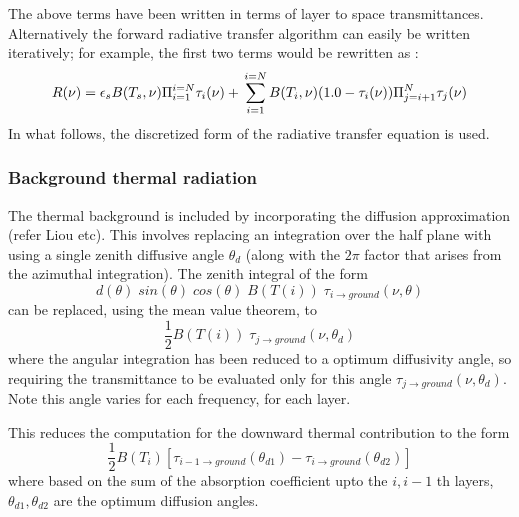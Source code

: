 \documentclass[12pt]{article}
\begin{document}
{{{{The above terms have been written in terms of layer to space transmittances. 
Alternatively the forward radiative transfer algorithm can easily be written 
iteratively; for example, the first two terms would be rewritten as : 
\begin{equation}
R(\nu) = \epsilon_{s}B(T_{s},\nu) \Pi_{i=1}^{i=N} \tau_{i}(\nu) + \\
         \sum_{i=1}^{i=N} B(T_{i},\nu) (1.0 - \tau_{i}(\nu))\\
         \Pi_{j=i+1}^{N} \tau_{j}(\nu)
\end{equation}
In what follows, the discretized form of the radiative transfer equation 
is used.

\subsubsection{Background thermal radiation}

The thermal background is included by incorporating the diffusion approximation
(refer Liou etc).  This involves replacing an integration over the half plane
with using a single zenith diffusive angle $\theta_{d}$ (along with the 
$2\pi$ factor that arises from the azimuthal integration). 
The zenith integral of the form
\begin{equation}
    d(\theta) \; sin(\theta) \; cos(\theta) \; B(T(i)) \;
    \tau_{i \rightarrow ground}(\nu,\theta)
\end{equation}
can be replaced, using the mean value theorem, to
\begin{equation}
   \frac{1}{2} B(T(i)) \; \tau_{j \rightarrow ground}(\nu,\theta_{d})
\end{equation}
where the angular integration has been reduced to a optimum diffusivity
angle, so requiring the transmittance to be evaluated only for this angle
$\tau_{j \rightarrow ground}(\nu,\theta_{d})$.  Note this angle varies for
each frequency, for each layer.

This reduces the computation for the downward thermal contribution to the form
\begin{equation}
    \frac{1}{2}B(T_{i})\left[ \tau_{i-1 \rightarrow ground}
(\theta_{d1})- \tau_{i \rightarrow ground}(\theta_{d2}) \right]
\end{equation}
where based on the sum of the absorption coefficient upto the $i,i-1$ th 
layers,  $\theta_{d1},\theta_{d2}$ are the optimum diffusion angles. 

}}}}
\end{document}
